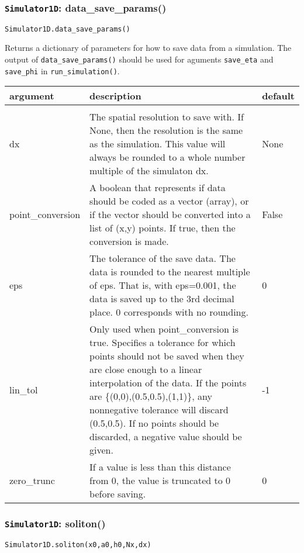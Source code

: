 \documentclass[10pt,a4paper]{article}
\newenvironment{optarglist}
    {\begin{center}
    \begin{tabular}{l|p{10cm}|l}
    argument & description & default\\
    \hline\\
    }
    { 
    \end{tabular} 
    \end{center}
    }
\begin{document}
\subsubsection{\texttt{Simulator1D}: data\_save\_params()}
\texttt{Simulator1D.data\_save\_params()}

Returns a dictionary of parameters for how to save data from a simulation. The output of \texttt{data\_save\_params()} should be used for aguments \texttt{save\_eta} and \texttt{save\_phi} in \texttt{run\_simulation()}.

\begin{optarglist}
        dx    
              & The spatial resolution to save with. If None, then the
                resolution is the same as the simulation. This value
                will always be rounded to a whole number multiple of
                the simulaton dx. & None \\\hline

        point\_conversion
              & A boolean that represents if data should be coded as
                a vector (array), or if the vector should be converted
                into a list of (x,y) points. If true, then the conversion
                is made. & False \\\hline

        eps
              & The tolerance of the save data. The data is rounded to the 
                nearest multiple of eps. That is, with eps=0.001, the data
                is saved up to the 3rd decimal place. 0 corresponds with
                no rounding. & 0\\\hline
        
        lin\_tol
             & Only used when point\_conversion is true. Specifies a tolerance
                for which points should not be saved when they are close enough
                to a linear interpolation of the data. If the points are 
                \{(0,0),(0.5,0.5),(1,1)\}, any nonnegative tolerance will discard
                (0.5,0.5). If no points should be discarded, a negative value
                should be given. & -1\\\hline
        
        zero\_trunc
              & If a value is less than this distance from 0, the value is 
                truncated to 0 before saving.& 0
\end{optarglist}




\subsubsection{\texttt{Simulator1D}: soliton()}
\texttt{Simulator1D.soliton(x0,a0,h0,Nx,dx)}
\end{document}
